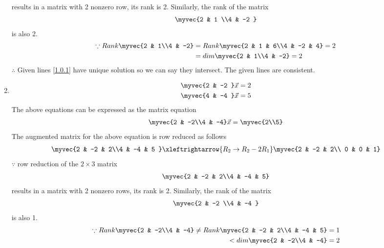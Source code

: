 \documentclass[journal,12pt,twocolumn]{IEEEtran}
\begin{document}
\begin{enumerate}
\begin{align}
\end{align}
%
results in a matrix with 2 nonzero row, its rank is 2. 
%
Similarly, the rank of the matrix 
\begin{align}
\myvec{2 & 1 \\4 & -2 } 
\end{align}
%
is also 2.
%
\begin{align}
\because Rank \myvec{2 & 1\\4 & -2} &= Rank\myvec{2 & 1 & 6\\4 & -2 & 4}=2\nonumber\\
&=dim\myvec{2 & 1\\4 & -2}=2
\end{align}
$\therefore$ Given lines \eqref{1.0.1} have unique solution so we can say they intersect. The given lines are consistent. 
\item
\begin{align}
\begin{split}
\myvec{2 & -2 }\vec{x}&=2
\\
\myvec{4 & -4 }\vec{x}&=5
\end{split}
\end{align}
The above equations can be expressed as the matrix equation
\begin{align}
\myvec{2 & -2\\4 & -4} \vec{x} = \myvec{2\\5}
\end{align}
%
The augmented matrix for the above equation is row reduced as follows
\begin{align}
\myvec{2 & -2 & 2\\4 & -4 & 5 } 
\xleftrightarrow{R_2 \rightarrow R_2-2R_1}
\myvec{2 & -2 & 2\\ 0 & 0 & 1}
\end{align}
%
$\because$ row reduction of the $2\times 3$ matrix
%
\begin{align}
\myvec{2 & -2 & 2\\4 & -4 & 5}
\end{align}
%
results in a matrix with 2 nonzero rows, its rank is 2. 
%
Similarly, the rank of the matrix 
\begin{align}
\myvec{2 & -2 \\4 & -4 } 
\end{align}
%
is also 1.
%
\begin{align}
\because Rank \myvec{2 & -2\\4 & -4} \ne Rank\myvec{2 & -2 & 2\\4 & -4 & 5}=1\nonumber\\<dim\myvec{2 & -2\\4 & -4}=2

\end{align}
\end{enumerate}
\end{document}
